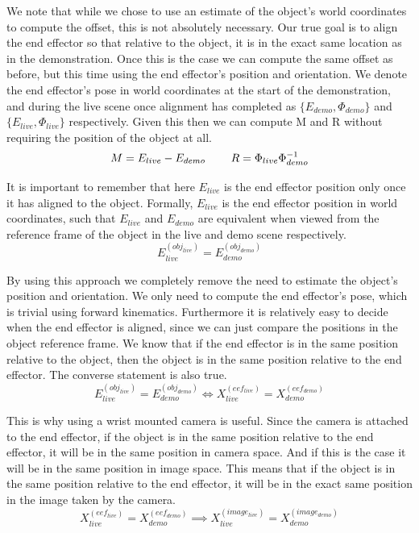 We note that while we chose to use an estimate of the object's world coordinates to compute the offset, this is not absolutely necessary. Our true goal is to align the end effector so that relative to the object, it is in the exact same location as in the demonstration. Once this is the case we can compute the same offset as before, but this time using the end effector's position and orientation. We denote the end effector's pose in world coordinates at the start of the demonstration, and during the live scene once alignment has completed as $\{E_{demo}, \Phi_{demo}\}$ and $\{E_{live}, \Phi_{live}\}$ respectively. Given this then we can compute M and R without requiring the position of the object at all.
$$M = E_{live} - E_{demo} \operatorname{\operatorname{\: \: \: \:} \operatorname{\: \: \: \:}} R = \Phi_{live} \Phi_{demo}^{-1}$$

It is important to remember that here $E_{live}$ is the end effector position only once it has aligned to the object. Formally, $E_{live}$ is the end effector position in world coordinates, such that $E_{live}$ and $E_{demo}$ are equivalent when viewed from the reference frame of the object in the live and demo scene respectively.
$$E_{live}^{(obj_{live})} = E_{demo}^{(obj_{demo})}$$

By using this approach we completely remove the need to estimate the object's position and orientation. We only need to compute the end effector's pose, which is trivial using forward kinematics. Furthermore it is relatively easy to decide when the end effector is aligned, since we can just compare the positions in the object reference frame. We know that if the end effector is in the same position relative to the object, then the object is in the same position relative to the end effector. The converse statement is also true.
$$E_{live}^{(obj_{live})} = E_{demo}^{(obj_{demo})} \iff X_{live}^{(eef_{live})} = X_{demo}^{(eef_{demo})}$$

This is why using a wrist mounted camera is useful. Since the camera is attached to the end effector, if the object is in the same position relative to the end effector, it will be in the same position in camera space. And if this is the case it will be in the same position in image space. This means that if the object is in the same position relative to the end effector, it will be in the exact same position in the image taken by the camera.
$$X_{live}^{(eef_{live})} = X_{demo}^{(eef_{demo})} \implies X_{live}^{(image_{live})} = X_{demo}^{(image_{demo})}$$


